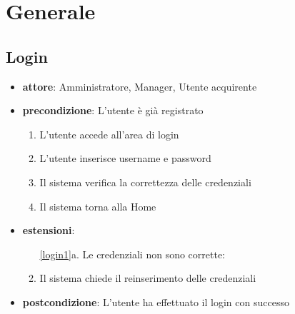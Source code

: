 \chapter{Generale}

\section{Login}
\begin{itemize}
    \item \textbf{attore}: Amministratore, Manager, Utente acquirente
    \item \textbf{precondizione}: L’utente è già registrato
    
    \begin{enumerate}
        \item L’utente accede all’area di login
        \item L’utente inserisce username e password
        \item Il sistema verifica la correttezza delle credenziali
		\label{login1}        
		\item Il sistema torna alla Home
    \end{enumerate}

    \item \textbf{estensioni}:
	\begin {enumerate}
		\item[\ref{login1}a.] Le credenziali non sono corrette:
		
		\item Il sistema chiede il reinserimento delle credenziali
	\end{enumerate}

	\item \textbf{postcondizione}: L’utente ha effettuato il login con successo
\end{itemize}


